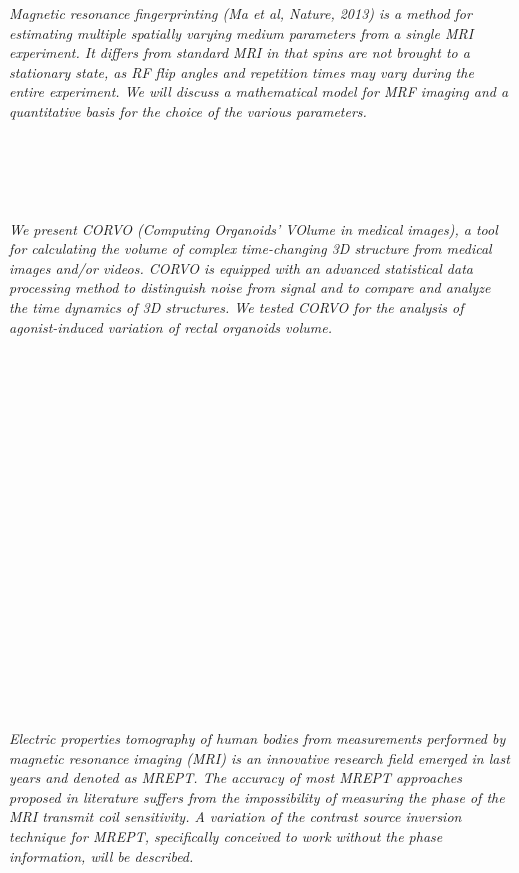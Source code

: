   \begin{multicols}{2}
      \textit{Magnetic resonance fingerprinting (Ma et al, Nature, 2013) is a method for estimating multiple spatially varying medium parameters from a single MRI experiment. It differs from standard MRI in that spins are not brought to a stationary state, as RF flip angles and repetition times may vary during the entire experiment.  We will discuss a mathematical model for MRF imaging and a quantitative basis for the choice of the various parameters.}\\
\\ 
        \\
        \\\\
\\
      \textit{We present CORVO (Computing Organoids’ VOlume in medical images), a tool for calculating the volume of complex time-changing 3D structure from medical images and/or videos. CORVO is equipped with an advanced statistical data processing method to distinguish noise from signal and to compare and analyze the time dynamics of 3D structures. We tested CORVO for the analysis of agonist-induced variation of rectal organoids volume.}\\
\\ 
        \\
        \\\\
        \\
        \\\\
        \\
        \\\\
        \\
        \\\\
        \\
        \\\\
        \\
        \\\\
\\
      \textit{Electric properties tomography of human bodies from measurements performed by magnetic resonance imaging (MRI) is an innovative research field emerged in last years and denoted as MREPT. The accuracy of most MREPT approaches proposed in literature suffers from the impossibility of measuring the phase of the MRI transmit coil sensitivity. A variation of the contrast source inversion technique for MREPT, specifically conceived to work without the phase information, will be described.}\\

\end{multicols}
